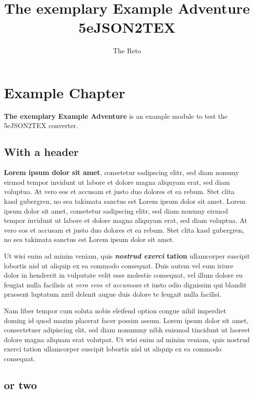 \documentclass[10pt,twoside,twocolumn,openany,nodeprecatedcode]{dndbook}
\title{The exemplary Example Adventure \\ \large 5eJSON2TEX}
\author{The Reto}
\begin{document}
\maketitle
{}
\tableofcontents
\newpage
\chapter{Example Chapter}

\textbf{The exemplary Example Adventure} is an example module to test the 5eJSON2TEX converter.

\section{With a header}

\textbf{Lorem ipsum dolor sit amet}, consetetur sadipscing elitr, sed diam nonumy eirmod tempor invidunt ut labore et dolore magna aliquyam erat, sed diam voluptua. At vero eos et accusam et justo duo dolores et ea rebum. Stet clita kasd gubergren, no sea takimata sanctus est Lorem ipsum dolor sit amet. Lorem ipsum dolor sit amet, consetetur sadipscing elitr, sed diam nonumy eirmod tempor invidunt ut labore et dolore magna aliquyam erat, sed diam voluptua. At vero eos et accusam et justo duo dolores et ea rebum. Stet clita kasd gubergren, no sea takimata sanctus est Lorem ipsum dolor sit amet.

Ut wisi enim ad minim veniam, quis \textbf{\textit{nostrud exerci} tation} ullamcorper suscipit lobortis nisl ut aliquip ex ea commodo consequat. Duis autem vel eum iriure dolor in hendrerit in vulputate velit esse molestie consequat, vel illum dolore eu feugiat nulla facilisis at \textit{vero eros et accumsan} et iusto odio dignissim qui blandit praesent luptatum zzril delenit augue duis dolore te feugait nulla facilisi.

Nam liber tempor cum soluta nobis eleifend option congue nihil imperdiet doming id quod mazim placerat facer possim assum. Lorem ipsum dolor sit amet, consectetuer adipiscing elit, sed diam nonummy nibh euismod tincidunt ut laoreet dolore magna aliquam erat volutpat. Ut wisi enim ad minim veniam, quis nostrud exerci tation ullamcorper suscipit lobortis nisl ut aliquip ex ea commodo consequat.

\section{or two}
\end{document}
